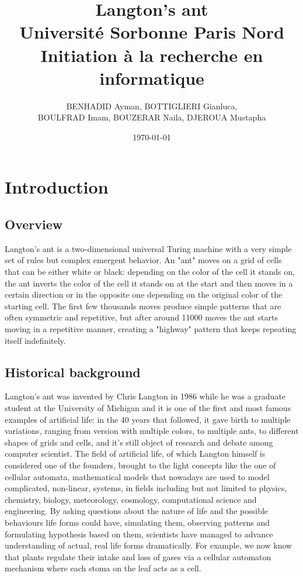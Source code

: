 \documentclass{article}
\title{Langton's ant \\  \LARGE Université Sorbonne Paris Nord \\ \large Initiation à la recherche en informatique}
\author{BENHADID Ayman, BOTTIGLIERI Gianluca, \\ BOULFRAD Imam, BOUZERAR Naila,  DJEROUA Mustapha}
\date{\today}
\begin{document}
\maketitle

\newpage

\tableofcontents

\newpage

\tableofcontents

\section{Introduction}
\subsection{Overview}
Langton's ant is a two-dimensional universal Turing machine with a very simple set of rules but complex emergent behavior. 
An "ant" moves on a grid of cells that can be either white or black: depending on the color of the cell it stands on, the ant 
inverts the color of the cell it stands on at the start and then moves in a certain direction or in the opposite one depending
on the original color of the starting cell. 
The first few thousands moves produce simple patterns that are often symmetric and repetitive, but after around 11000 moves 
the ant starts moving in a repetitive manner, creating a "highway" pattern that keeps repeating itself indefinitely.

\subsection{Historical background}
Langton's ant was invented by Chris Langton in 1986 while he was a graduate student at the University of Michigan and it is one of the first 
and most famous examples of artificial life: in the 40 years that followed, it gave birth to multiple  variations, ranging from version with 
multiple colors, to multiple ants, to different shapes of grids and cells, and it's still object of research and debate among computer scientist.
The field of artificial life, of which Langton himself is considered one of the founders, brought to the light concepts like 
the one of cellular automata, mathematical models that nowadays are used to model complicated, non-linear, systems, in fields including but not limited to physics,
chemistry, biology, meteorology, cosmology, computational science and engineering. By asking questions about the nature of life and the possible
behaviours life forms could have, simulating them, observing patterns and formulating hypothesis based on them, scientists have managed to 
advance understanding of actual, real life forms dramatically. For example, we now know that plants regulate their intake and loss of gases 
via a cellular automaton mechanism where each stoma on the leaf acts as a cell.
\end{document}
